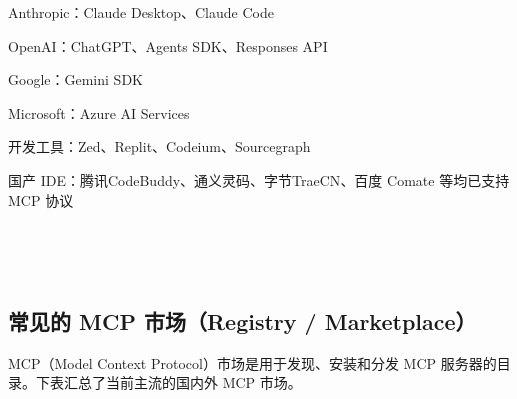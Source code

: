 \documentclass[
  american,
  chinese,
]{ctexart}
\begin{document}
\foreignlanguage{american}{Anthropic}{：}\foreignlanguage{american}{Claude Desktop}{、}\foreignlanguage{american}{Claude Code}

\foreignlanguage{american}{OpenAI}{：}\foreignlanguage{american}{ChatGPT}{、}\foreignlanguage{american}{Agents SDK}{、}\foreignlanguage{american}{Responses API}

\foreignlanguage{american}{Google}{：}\foreignlanguage{american}{Gemini SDK}

\foreignlanguage{american}{Microsoft}{：}\foreignlanguage{american}{Azure AI Services}

{开发工具：}\foreignlanguage{american}{Zed}{、}{\foreignlanguage{american}{Replit}}{、}{\foreignlanguage{american}{Codeium}}{、}{\foreignlanguage{american}{Sourcegraph}}\foreignlanguage{american}{}

{国产}\foreignlanguage{american}{ IDE}{：{腾讯}}\foreignlanguage{american}{ {CodeBuddy}}{、通义灵码、字节}\foreignlanguage{american}{ {TraeCN}}{、百度}\foreignlanguage{american}{ Comate }{等均已支持}\foreignlanguage{american}{ MCP }{协议}\foreignlanguage{american}{}

\foreignlanguage{american}{\hfill\break
}

\foreignlanguage{american}{}

~

\foreignlanguage{american}{}

~

\subsection{\texorpdfstring{\foreignlanguage{american}{常见的}\foreignlanguage{american}{ MCP }\foreignlanguage{american}{市场（}\foreignlanguage{american}{Registry / Marketplace}\foreignlanguage{american}{）}\foreignlanguage{american}{}}{常见的 MCP 市场（Registry / Marketplace）}}\label{ux5e38ux89c1ux7684-mcp-ux5e02ux573aregistry-marketplace}

\foreignlanguage{american}{MCP}{（}\foreignlanguage{american}{Model Context Protocol}{）市场是用于发现、安装和分发}\foreignlanguage{american}{
MCP }{服务器的目录。下表汇总了当前主流的国内外}\foreignlanguage{american}{
MCP }{市场。}\foreignlanguage{american}{}
\end{document}
